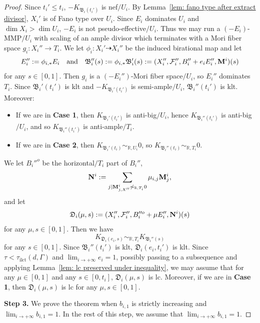 \documentclass[11pt,reqno]{amsart}
\numberwithin{equation}{section}
\newcommand{\Mm}{{\bf{M}}}
\newcommand{\Nn}{{\bf{N}}}
\newcommand{\Dd}{{\mathfrak{D}}}
\newcommand{\ilct}{\operatorname{ilct}}
\newcommand{\Bb}{{\mathfrak{B}}}
\newcommand{\Ff}{\mathcal{F}}
\newcommand{\Ii}{\Gamma}
\theoremstyle{definition}
\begin{document}
\begin{proof}
Since $t_i'\leq t_i$, $-K_{\Bb_i(t_i')}$ is nef$/U_i$. By Lemma~\ref{lem: fano type after extract divisor}, $X_i'$ is of Fano type over $U_i$. Since $E_i$ dominates $U_i$ and $\dim X_i>\dim U_i$, $-E_i$ is not pseudo-effective$/U_i$. Thus we may run a $(-E_i)$-MMP$/U_i$ with scaling of an ample divisor which terminates with a Mori fiber space $g_i: X_i''\rightarrow T_i$. We let $\phi_i: X_i'\dashrightarrow X_i''$ be the induced birational map and let
$$E_i'':=\phi_{i,*}E_i\quad \text{and}\quad \Bb_i''(s):=\phi_{i,*}\Bb_i'(s):=(X_i'',\Ff_i'',B_i''+e_iE_i'',\Mm^i)(s)$$
for any $s\in [0,1]$. Then $g_i$ is a $(-E_i'')$-Mori fiber space$/U_i$, so $E_i''$ dominates $T_i$. Since $\Bb_i'(t_i')$ is klt and $-K_{\Bb_i'(t_i')}$ is semi-ample$/U_i$, $\Bb_i''(t_i')$ is klt. Moreover:
\begin{itemize}
    \item If we are in \textbf{Case 1}, then $K_{\Bb_i'(t_i')}$ is anti-big$/U_i$, hence $K_{\Bb_i''(t_i')}$ is anti-big$/U_i$, and so $K_{\Bb_i''(t_i')}$ is anti-ample$/T_i$.
    \item If we are in \textbf{Case 2}, then $K_{\Bb_i'(t_i)}\sim_{\mathbb R,U_i}0$, so $K_{\Bb_i''(t_i)}\sim_{\mathbb R,T_i}0.$
\end{itemize}
We let $B_i''^o$ be the horizontal$/T_i$ part of $B_i''$,
$$\Nn^i:=\sum_{j\mid\Mm^i_{j,X''}\not\sim_{\mathbb R,T_i}0}\mu_{i,j}\Mm^i_{j},$$
and let
$$\Dd_i(\mu,s):=(X_i'',\Ff_i'',B_i''^o+\mu E_i'',\Nn^i)(s)$$
for any $\mu,s\in [0,1]$. Then we have
$$K_{\Dd_i(e_i,s)}\sim_{\mathbb R,T_i}K_{\Bb_i''(s)}$$
for any $s\in [0,1]$. Since $\Bb_i''(t_i')$ is klt, $\Dd_i(e_i,t_i')$ is klt. Since $\tau<\tau_{\ilct}(d,\Ii)$ and $\lim_{i\rightarrow+\infty}e_i=1$, possibly passing to a subsequence and applying Lemma~\ref{lem: lc preserved under inequality}, we may assume that for any $\mu\in [0,1]$ and any $s\in [0,t_i]$, $\Dd_i(\mu,s)$ is lc. Moreover, if we are in \textbf{Case 1}, then $\Dd_i(\mu,s)$ is lc for any $\mu,s\in [0,1]$.


\medskip

\noindent\textbf{Step 3.} We prove the theorem when $b_{i,1}$ is strictly increasing and $\lim_{i\rightarrow+\infty}b_{i,1}=1$. In the rest of this step, we assume that $\lim_{i\rightarrow+\infty}b_{i,1}=1$.


\end{proof}
\end{document}
